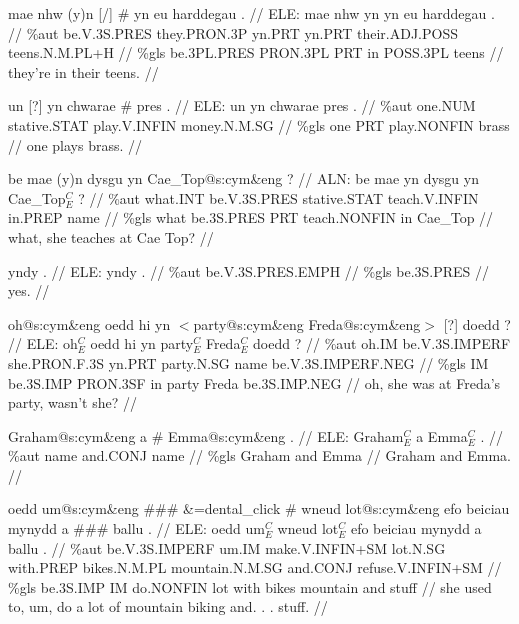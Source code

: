 \documentclass[a4paper,10pt]{article}
\begin{document}
\ex
\begingl[lingstyle=gergl]
\glchat mae nhw (y)n [/] \# yn eu harddegau . //
\glsurface ELE:  mae nhw yn yn eu harddegau .  //
\glauto \%aut  be{\scriptsize .V.3S.PRES} they{\scriptsize .PRON.3P} yn{\scriptsize .PRT} yn{\scriptsize .PRT} their{\scriptsize .ADJ.POSS} teens{\scriptsize .N.M.PL+H}   //
\glmanual \%gls  be{\scriptsize .3PL.PRES} PRON{\scriptsize .3PL} PRT in POSS{\scriptsize .3PL} teens   //
\gleng they're in their teens. //
\endgl
\xe

\ex
\begingl[lingstyle=gergl]
\glchat un [?] yn chwarae \# pres . //
\glsurface ELE:  un yn chwarae pres .  //
\glauto \%aut  one{\scriptsize .NUM} stative{\scriptsize .STAT} play{\scriptsize .V.INFIN} money{\scriptsize .N.M.SG}   //
\glmanual \%gls  one PRT play{\scriptsize .NONFIN} brass   //
\gleng one plays brass. //
\endgl
\xe

\ex
\begingl[lingstyle=gergl]
\glchat be mae (y)n dysgu yn Cae\_Top@s:cym\&eng ? //
\glsurface ALN:  be mae yn dysgu yn Cae\_Top$^{C}_{E}$ ?  //
\glauto \%aut  what{\scriptsize .INT} be{\scriptsize .V.3S.PRES} stative{\scriptsize .STAT} teach{\scriptsize .V.INFIN} in{\scriptsize .PREP} name   //
\glmanual \%gls  what be{\scriptsize .3S.PRES} PRT teach{\scriptsize .NONFIN} in Cae\_Top   //
\gleng what, she teaches at Cae Top? //
\endgl
\xe

\ex
\begingl[lingstyle=gergl]
\glchat yndy . //
\glsurface ELE:  yndy .  //
\glauto \%aut  be{\scriptsize .V.3S.PRES.EMPH}   //
\glmanual \%gls  be{\scriptsize .3S.PRES}   //
\gleng yes. //
\endgl
\xe

\ex
\begingl[lingstyle=gergl]
\glchat oh@s:cym\&eng oedd hi yn $<$party@s:cym\&eng Freda@s:cym\&eng$>$ [?] doedd ? //
\glsurface ELE:  oh$^{C}_{E}$ oedd hi yn party$^{C}_{E}$ Freda$^{C}_{E}$ doedd ?  //
\glauto \%aut  oh{\scriptsize .IM} be{\scriptsize .V.3S.IMPERF} she{\scriptsize .PRON.F.3S} yn{\scriptsize .PRT} party{\scriptsize .N.SG} name be{\scriptsize .V.3S.IMPERF.NEG}   //
\glmanual \%gls  IM be{\scriptsize .3S.IMP} PRON{\scriptsize .3SF} in party Freda be{\scriptsize .3S.IMP.NEG}   //
\gleng oh, she was at Freda's party, wasn't she? //
\endgl
\xe

\ex
\begingl[lingstyle=gergl]
\glchat Graham@s:cym\&eng a \# Emma@s:cym\&eng . //
\glsurface ELE:  Graham$^{C}_{E}$ a Emma$^{C}_{E}$ .  //
\glauto \%aut  name and{\scriptsize .CONJ} name   //
\glmanual \%gls  Graham and Emma   //
\gleng Graham and Emma. //
\endgl
\xe

\ex
\begingl[lingstyle=gergl]
\glchat oedd um@s:cym\&eng \#\#\# \&=dental\_click \# wneud lot@s:cym\&eng efo beiciau mynydd a \#\#\# ballu . //
\glsurface ELE:  oedd um$^{C}_{E}$ wneud lot$^{C}_{E}$ efo beiciau mynydd a ballu .  //
\glauto \%aut  be{\scriptsize .V.3S.IMPERF} um{\scriptsize .IM} make{\scriptsize .V.INFIN+SM} lot{\scriptsize .N.SG} with{\scriptsize .PREP} bikes{\scriptsize .N.M.PL} mountain{\scriptsize .N.M.SG} and{\scriptsize .CONJ} refuse{\scriptsize .V.INFIN+SM}   //
\glmanual \%gls  be{\scriptsize .3S.IMP} IM do{\scriptsize .NONFIN} lot with bikes mountain and stuff   //
\gleng she used to, um, do a lot of mountain biking and. . . stuff. //
\endgl
\xe
\end{document}
